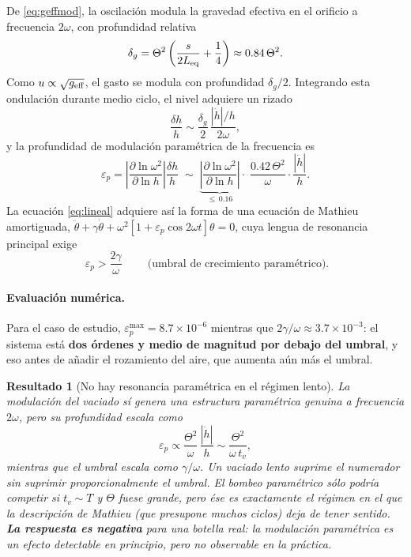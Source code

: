 \documentclass[11pt,a4paper]{article}
\newcommand{\eps}{\varepsilon}
\newtheorem{resultado}{Resultado}
\begin{document}
De \eqref{eq:geffmod}, la oscilación modula la gravedad efectiva en el orificio a frecuencia
$2\omega$, con profundidad relativa
\begin{equation}
\delta_g = \Theta^2\left(\frac{s}{2L_{\rm eq}}+\frac14\right)\approx 0.84\,\Theta^2 .
\end{equation}
Como $u\propto\sqrt{g_{\rm eff}}$, el gasto se modula con profundidad $\delta_g/2$. Integrando esta
ondulación durante medio ciclo, el nivel adquiere un rizado
\begin{equation}
\frac{\delta h}{h} \sim \frac{\delta_g}{2}\,\frac{|\dot h|/h}{2\omega},
\end{equation}
y la profundidad de modulación paramétrica de la frecuencia es
\begin{equation}
\eps_p = \left|\frac{\partial\ln\omega^2}{\partial\ln h}\right|\frac{\delta h}{h}
\;\sim\;
\underbrace{\left|\frac{\partial\ln\omega^2}{\partial\ln h}\right|}_{\le\,0.16}
\cdot\;\frac{0.42\,\Theta^2}{\omega}\cdot\frac{|\dot h|}{h}.
\label{eq:epsp}
\end{equation}
La ecuación \eqref{eq:lineal} adquiere así la forma de una ecuación de Mathieu amortiguada,
$\ddot\theta+\gamma\dot\theta+\omega^2[1+\eps_p\cos 2\omega t]\theta=0$, cuya lengua de resonancia
principal exige
\begin{equation}
\boxed{\;\eps_p > \frac{2\gamma}{\omega}\;}
\qquad\text{(umbral de crecimiento paramétrico).}
\end{equation}

\paragraph{Evaluación numérica.} Para el caso de estudio,
$\eps_p^{\max}=8.7\times10^{-6}$ mientras que $2\gamma/\omega\approx 3.7\times10^{-3}$: el sistema
está \textbf{dos órdenes y medio de magnitud por debajo del umbral}, y eso antes de añadir el
rozamiento del aire, que aumenta aún más el umbral.

\begin{resultado}[No hay resonancia paramétrica en el régimen lento]
La modulación del vaciado sí genera una estructura paramétrica genuina a frecuencia $2\omega$,
pero su profundidad escala como
\[
\eps_p \propto \frac{\Theta^2}{\omega}\,\frac{|\dot h|}{h}\sim\frac{\Theta^2}{\omega\,t_v},
\]
mientras que el umbral escala como $\gamma/\omega$. Un vaciado lento suprime el numerador sin
suprimir proporcionalmente el umbral. El bombeo paramétrico sólo podría competir si
$t_v\sim T$ \emph{y} $\Theta$ fuese grande, pero ése es exactamente el régimen en el que la
descripción de Mathieu (que presupone muchos ciclos) deja de tener sentido.
\textbf{La respuesta es negativa} para una botella real: la modulación paramétrica es un efecto
detectable en principio, pero no observable en la práctica.
\end{resultado}
\end{document}
